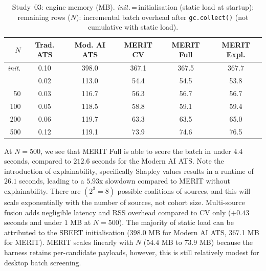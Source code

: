 \begin{table}[htbp]
    \centering
    \caption[Study~03: Engine memory]{Study~03: engine memory (MB). \textit{init.}\,=\,initialisation (static load at startup); remaining rows ($N$): incremental batch overhead after \texttt{gc.collect()} (not cumulative with static load).}
    \label{tab:study03-memory}
    \vspace{1.5ex}
    \small
    \setlength{\tabcolsep}{6pt}
    \begin{tabular}{r c c c c c}
        \toprule
        \textbf{$N$} & \textbf{Trad. ATS} & \textbf{Mod. AI ATS} & \textbf{MERIT CV} & \textbf{MERIT Full} & \textbf{MERIT Expl.} \\ \midrule
        \textit{init.} & 0.10 & 398.0 & 367.1 & 367.5 & 367.7 \\ \addlinespace
        10  & 0.02 & 113.0 & 54.4 & 54.5 & 53.8 \\
        50  & 0.03 & 116.7 & 56.3 & 56.7 & 56.7 \\
        100 & 0.05 & 118.5 & 58.8 & 59.1 & 59.4 \\
        200 & 0.06 & 119.7 & 63.3 & 63.5 & 65.0 \\
        500 & 0.12 & 119.1 & 73.9 & 74.6 & 76.5 \\ \bottomrule
    \end{tabular}
\end{table}

At $N = 500$, we see that MERIT Full is able to score the batch in under $4.4$ seconds, compared to $212.6$ seconds 
for the Modern AI ATS. Note the introduction of explainability, specifically Shapley values results in a runtime of 
$26.1$ seconds, leading to a $5.93$x slowdown compared to MERIT without explainability. There are $(2^3 = 8)$ possible 
coalitions of sources, and this will scale exponentially with the number of sources, not cohort size. Multi-source
fusion adds negligible latency and RSS overhead compared to CV only ($+0.43$ seconds and under $1$ MB at $N = 500$).
The majority of static load can be attributed to the SBERT initialisation (398.0 MB for Modern AI ATS, 367.1 MB for MERIT).
MERIT scales linearly with $N$ ($54.4$ MB to $73.9$ MB) because the harness retains per-candidate payloads, however,
this is still relatively modest for desktop batch screening.
